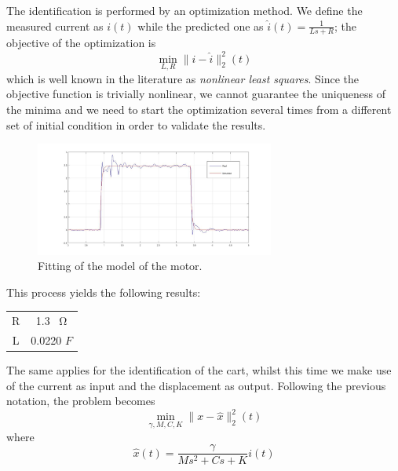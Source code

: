 The identification is performed by an optimization method. We define the measured current as $i(t)$ while the predicted one as $\hat{i}(t) = \frac{1}{Ls+R}$; the objective of the optimization is
\begin{equation}
\min_{L,R} \|i-\hat{i}\|_2^2(t)
\end{equation}
which is well known in the literature as \emph{nonlinear least squares}. Since the objective function is trivially nonlinear, we cannot guarantee the uniqueness of the minima and we need to start the optimization several times from a different set of initial condition in order to validate the results.
\begin{figure}[h]
\centering
\includegraphics[width=0.7\textwidth]{img/graybox_motor.jpg}
\caption{Fitting of the model of the motor.}
\end{figure}

This process yields the following results:
\begin{table}
\centering
\begin{tabular}{|c|c|}
R & 1.3 \SI{}{\ohm} \\
L & 0.0220 $F$ \\
\end{tabular}
\end{table}

The same applies for the identification of the cart, whilst this time we make use of the current as input and the displacement as output. Following the previous notation, the problem becomes
\begin{equation}
\min_{\gamma,M,C,K} \|x-\hat{x}\|_2^2(t)
\end{equation}
where
\begin{equation}
\hat{x}(t) = \frac{\gamma}{Ms^2+Cs+K} i(t)
\end{equation}

